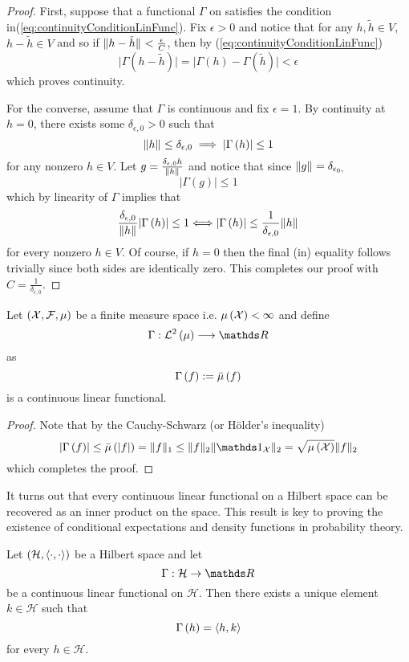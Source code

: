 \begin{proof}
First, suppose that a functional $\Gamma$ on satisfies the condition
in(\ref{eq:continuityConditionLinFunc}). Fix $\epsilon>0$ and notice
that for any $h,\tilde{h}\in V$, $h-\tilde{h}\in V$ and so if $\lVert h-\tilde{h}\rVert_{}<\frac{\epsilon}{C}$,
then by (\ref{eq:continuityConditionLinFunc})
\[
\lvert\Gamma\left(h-\tilde{h}\right)\rvert=\lvert\Gamma\left(h\right)-\Gamma\left(\tilde{h}\right)\rvert<\epsilon
\]
which proves continuity.

For the converse, assume that $\Gamma$ is continuous and fix $\epsilon=1.$
By continuity at $h=0$, there exists some $\delta_{\epsilon,0}>0$
such that
\[
\lVert h\rVert_{}\leq\delta_{\epsilon,0}\implies\lvert\Gamma\left(h\right)\rvert\leq1
\]
for any nonzero $h\in V.$ Let $g=\frac{\delta_{\epsilon,0}h}{\lVert h\rVert_{}}$
and notice that since $\lVert g\rVert_{}=\delta_{\epsilon_{0},}$
\[
\lvert\Gamma\left(g\right)\rvert\leq1
\]
which by linearity of $\Gamma$ implies that
\[
\frac{\delta_{\epsilon,0}}{\lVert h\rVert_{}}\lvert\Gamma\left(h\right)\rvert\leq1\Longleftrightarrow\lvert\Gamma\left(h\right)\rvert\leq\frac{1}{\delta_{\epsilon,0}}\lVert h\rVert_{}
\]
for every nonzero $h\in V$. Of course, if $h=0$ then the final (in)
equality follows trivially since both sides are identically zero.
This completes our proof with $C=\frac{1}{\delta_{\epsilon,0}}.$
\end{proof}
\begin{cor}
\label{cor:integrationContinuousLinearFunctional} Let $\left(\mathcal{X},\mathcal{F},\mu\right)$
be a finite measure space i.e. $\mu\left(\mathcal{X}\right)<\infty$ and define
\[
\Gamma:\Lp 2{\mu}\longrightarrow\R
\]
as
\[
\Gamma\left(f\right):=\bar{\mu}\left(f\right)
\]
is a continuous linear functional.
\end{cor}

\begin{proof}
Note that by the Cauchy-Schwarz (or H\"{o}lder's inequality)
\[
\lvert\Gamma\left(f\right)\rvert\leq\lebInt{\mu}{\lvert f\rvert}=\pnorm f1\leq\pnorm f2\pnorm{\indicate_{\X}}2=\sqrt{\mu\left(\X\right)}\pnorm f2
\]
which completes the proof.
\end{proof}
It turns out that every continuous linear functional on a Hilbert
space can be recovered as an inner product on the space. This result
is key to proving the existence of conditional expectations and density
functions in probability theory.
\begin{thm}
\label{thm:rieszRep}Let $\left(\mathcal{H},\langle\cdot,\cdot\rangle\right)$
be a Hilbert space and let 
\[
\Gamma:\mathcal{H}\to\R
\]
be a continuous linear functional on $\mathcal{H}.$ Then there exists
a unique element $k\in\mathcal{H}$ such that
\[
\Gamma\left(h\right)=\langle h,k\rangle
\]
for every $h\in\mathcal{H}$.
\end{thm}

